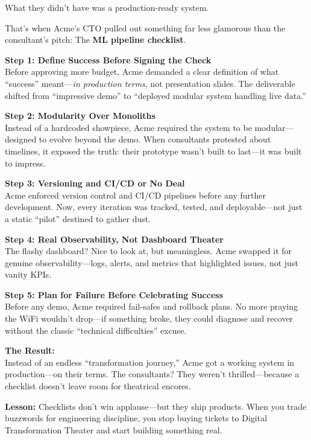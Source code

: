 What they didn’t have was a production-ready system.

That’s when Acme’s CTO pulled out something far less glamorous than the consultant’s pitch:  The \textbf{ML pipeline checklist}.

\textbf{Step 1: Define Success Before Signing the Check} \\
Before approving more budget, Acme demanded a clear definition of what ``success'' meant—\textit{in production terms}, not presentation slides. The deliverable shifted from ``impressive demo'' to ``deployed modular system handling live data.''

\textbf{Step 2: Modularity Over Monoliths} \\
Instead of a hardcoded showpiece, Acme required the system to be modular—designed to evolve beyond the demo. When consultants protested about timelines, it exposed the truth: their prototype wasn’t built to last—it was built to impress.

\textbf{Step 3: Versioning and CI/CD or No Deal} \\
Acme enforced version control and CI/CD pipelines before any further development. Now, every iteration was tracked, tested, and deployable—not just a static ``pilot'' destined to gather dust.

\textbf{Step 4: Real Observability, Not Dashboard Theater} \\
The flashy dashboard? Nice to look at, but meaningless. Acme swapped it for genuine observability—logs, alerts, and metrics that highlighted issues, not just vanity KPIs.


\textbf{Step 5: Plan for Failure Before Celebrating Success} \\
Before any demo, Acme required fail-safes and rollback plans. No more praying the WiFi wouldn’t drop—if something broke, they could diagnose and recover without the classic ``technical difficulties'' excuse.

\textbf{The Result:} \\
Instead of an endless ``transformation journey,'' Acme got a working system in production—on their terms. The consultants? They weren’t thrilled—because a checklist doesn’t leave room for theatrical encores.


\textbf{Lesson:} Checklists don’t win applause—but they ship products. When you trade buzzwords for engineering discipline, you stop buying tickets to Digital Transformation Theater and start building something real.
